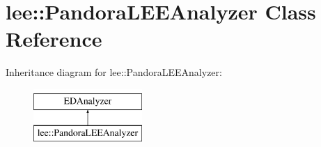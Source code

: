 \hypertarget{classlee_1_1PandoraLEEAnalyzer}{\section{lee\-:\-:Pandora\-L\-E\-E\-Analyzer Class Reference}
\label{classlee_1_1PandoraLEEAnalyzer}
}
Inheritance diagram for lee\-:\-:Pandora\-L\-E\-E\-Analyzer\-:\begin{figure}[H]
\begin{center}
\leavevmode
\includegraphics[height=2.000000cm]{classlee_1_1PandoraLEEAnalyzer}
\end{center}
\end{figure}
